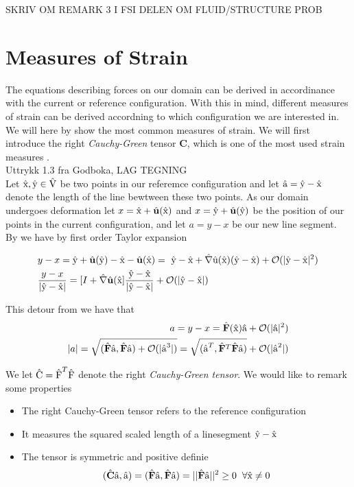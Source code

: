 SKRIV OM REMARK 3 I FSI DELEN OM FLUID/STRUCTURE PROB
\section{Measures of Strain}
The equations describing forces on our domain can be derived in accordinance with the current or
reference configuration. With this in mind, different measures of strain can be derived accordning to which configuration we are 
interested in. We will here by \cite{Richter2016} show the most common measures of strain. We will first introduce the right \textit{Cauchy-Green} tensor \textbf{C}, which is one of the most used strain measures \cite{Wriggers2006}. \\ Uttrykk 1.3 fra Godboka, LAG TEGNING \\ 

Let $\text{\^{x}}, \text{\^{y}} \in \text{\^{V}}$ be two points in our referemce configuration and let $\text{\^{a}} = \text{\^{y}} - \text{\^{x}}$ denote the
length of the line bewtween these two points. As our domain undergoes deformation let 
$x = \ha{x} + \hat{u}( \ha{x} ) $ and $x = \ha{y} + \hat{u}( \ha{y} )  $ be the position of our points in the current configuration, and let $a = y - x$ be our new line segment. By \cite{Richter2016} we have by first order Taylor expansion

\begin{align*}
&y - x = \ha{y} + \hat{u}(\ha{y}) - \ha{x} - \hat{u}(\ha{x}) = \
\ha{y} - \ha{x} + \hat{\nabla}\ha{u}(\ha{x}) (\ha{y} - \ha{x}) 
+ \mathcal{O}(|\ha{y} - \ha{x} |^2) \\
&\frac{y - x}{|\ha{y} - \ha{x}|} = [I + \hat{\nabla}\hat{u}(\ha{x} ]  
\frac{\ha{y} - \ha{x}}{|\ha{y} - \ha{x}|} + \mathcal{O}(|\ha{y} - \ha{x} |) 
\end{align*}

This detour from \cite{Richter2016}  we have that 
\begin{align*}
a = y - x = \hat{F}(\ha{x})\ha{a} +  \mathcal{O}(|\ha{a} |^2) \\
|a| = \sqrt{ (\hat{F}\ha{a},\hat{F}\ha{a})+ \mathcal{O} (|\ha{a}^3|)  } = 
 \sqrt{ (\ha{a}^T, \hat{F}^T\hat{F}\ha{a})} + \mathcal{O} (|\ha{a}^2|)  
\end{align*}

We let $\text{\^{C}} = \text{\^{F}}^T \text{\^{F}}$ denote the right \textit{Cauchy-Green tensor}. We would like to remark some properties

\begin{itemize}
\item The right Cauchy-Green tensor refers to the reference configuration
\item It measures the squared scaled length of a linesegment $\text{\^{y}} - \text{\^{x}}$
\item The tensor is symmetric and positive definie
\begin{align*}
(\hat{C}\ha{a}, \ha{a}) = (\hat{F}\ha{a}, \hat{F}\ha{a}  ) = ||\hat{F} \ha{a} ||^2  \geq 0 \hspace{2mm} \forall \ha{x} \neq 0
\end{align*}
\end{itemize} 

